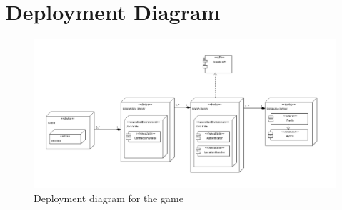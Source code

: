 \section{Deployment Diagram}
\begin{figure}[h]	
	\includegraphics[width=\textwidth]{figures/DeploymentDiagram}
	\centering
	\caption{Deployment diagram for the game}
	
\end{figure}
